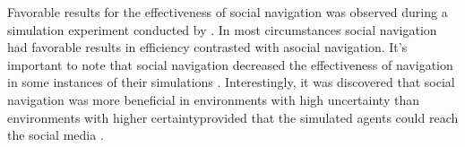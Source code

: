 Favorable results for the effectiveness of social navigation was observed
during a simulation experiment conducted by \citeauthor{riedl03}. In most
circumstances social navigation had favorable results in efficiency contrasted
with asocial navigation. It's important to note that social navigation
decreased the effectiveness of navigation in some instances of their
simulations \citeyearpar[]{riedl03}.
Interestingly, it was discovered that social navigation was more
beneficial in environments with high uncertainty%
than environments with higher certainty\dash{}provided that the
simulated agents could reach the social media
\citeyearpar[]{riedl03}. 
